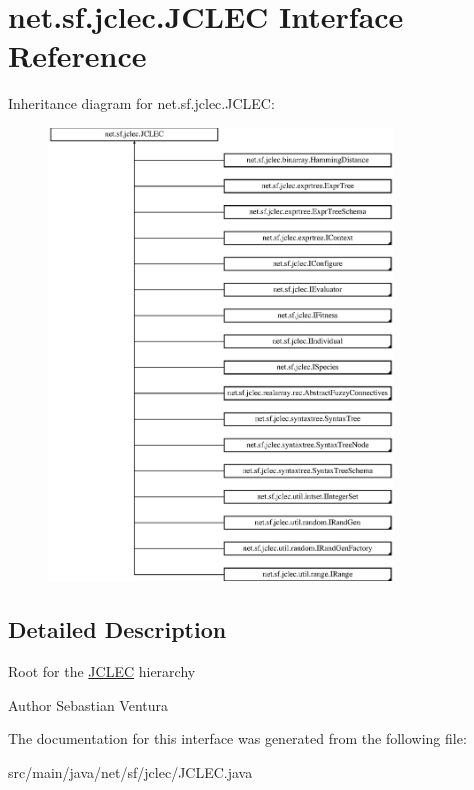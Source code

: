 \hypertarget{interfacenet_1_1sf_1_1jclec_1_1_j_c_l_e_c}{\section{net.\-sf.\-jclec.\-J\-C\-L\-E\-C Interface Reference}
\label{interfacenet_1_1sf_1_1jclec_1_1_j_c_l_e_c}
}
Inheritance diagram for net.\-sf.\-jclec.\-J\-C\-L\-E\-C\-:\begin{figure}[H]
\begin{center}
\leavevmode
\includegraphics[height=12.000000cm]{interfacenet_1_1sf_1_1jclec_1_1_j_c_l_e_c}
\end{center}
\end{figure}


\subsection{Detailed Description}
Root for the \hyperlink{interfacenet_1_1sf_1_1jclec_1_1_j_c_l_e_c}{J\-C\-L\-E\-C} hierarchy

\begin{DoxyAuthor}{Author}
Sebastian Ventura 
\end{DoxyAuthor}


The documentation for this interface was generated from the following file\-:\begin{DoxyCompactItemize}
\item 
src/main/java/net/sf/jclec/J\-C\-L\-E\-C.\-java\end{DoxyCompactItemize}
